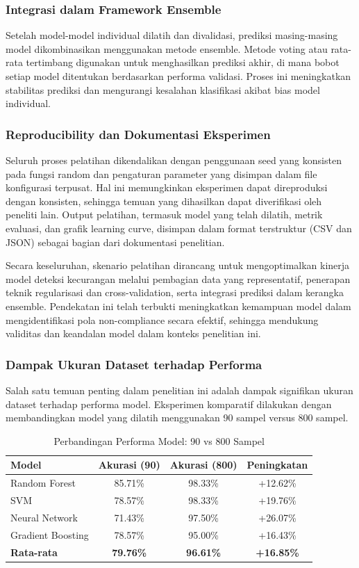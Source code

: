 \subsubsection{Integrasi dalam Framework Ensemble}
Setelah model-model individual dilatih dan divalidasi, prediksi masing-masing model dikombinasikan menggunakan metode ensemble. Metode voting atau rata-rata tertimbang digunakan untuk menghasilkan prediksi akhir, di mana bobot setiap model ditentukan berdasarkan performa validasi. Proses ini meningkatkan stabilitas prediksi dan mengurangi kesalahan klasifikasi akibat bias model individual.

\subsubsection{Reproducibility dan Dokumentasi Eksperimen}
Seluruh proses pelatihan dikendalikan dengan penggunaan seed yang konsisten pada fungsi random dan pengaturan parameter yang disimpan dalam file konfigurasi terpusat. Hal ini memungkinkan eksperimen dapat direproduksi dengan konsisten, sehingga temuan yang dihasilkan dapat diverifikasi oleh peneliti lain. Output pelatihan, termasuk model yang telah dilatih, metrik evaluasi, dan grafik learning curve, disimpan dalam format terstruktur (CSV dan JSON) sebagai bagian dari dokumentasi penelitian.

Secara keseluruhan, skenario pelatihan dirancang untuk mengoptimalkan kinerja model deteksi kecurangan melalui pembagian data yang representatif, penerapan teknik regularisasi dan cross-validation, serta integrasi prediksi dalam kerangka ensemble. Pendekatan ini telah terbukti meningkatkan kemampuan model dalam mengidentifikasi pola non-compliance secara efektif, sehingga mendukung validitas dan keandalan model dalam konteks penelitian ini.

\subsubsection{Dampak Ukuran Dataset terhadap Performa}
Salah satu temuan penting dalam penelitian ini adalah dampak signifikan ukuran dataset terhadap performa model. Eksperimen komparatif dilakukan dengan membandingkan model yang dilatih menggunakan 90 sampel versus 800 sampel.

\begin{table}[htbp]
\centering
\caption{Perbandingan Performa Model: 90 vs 800 Sampel}
\label{tabel:dampakUkuranDataset}
\begin{tabular}{|l|c|c|c|}
\hline
\textbf{Model} & \textbf{Akurasi (90)} & \textbf{Akurasi (800)} & \textbf{Peningkatan} \\
\hline
Random Forest & 85.71\% & 98.33\% & +12.62\% \\
\hline
SVM & 78.57\% & 98.33\% & +19.76\% \\
\hline
Neural Network & 71.43\% & 97.50\% & +26.07\% \\
\hline
Gradient Boosting & 78.57\% & 95.00\% & +16.43\% \\
\hline
\textbf{Rata-rata} & \textbf{79.76\%} & \textbf{96.61\%} & \textbf{+16.85\%} \\
\hline
\end{tabular}
\end{table}

